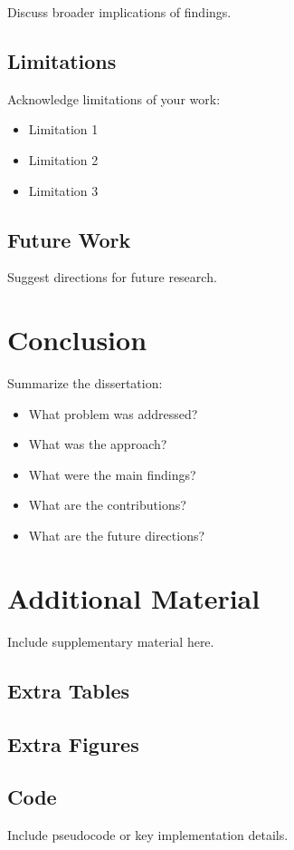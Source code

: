 \documentclass[12pt,oneside]{book}
\theoremstyle{plain}
\theoremstyle{definition}
\begin{document}
Discuss broader implications of findings.

\section{Limitations}

Acknowledge limitations of your work:

\begin{itemize}
  \item Limitation 1
  \item Limitation 2
  \item Limitation 3
\end{itemize}

\section{Future Work}

Suggest directions for future research.

\chapter{Conclusion}
\label{chapter:conclusion}

Summarize the dissertation:

\begin{itemize}
  \item What problem was addressed?
  \item What was the approach?
  \item What were the main findings?
  \item What are the contributions?
  \item What are the future directions?
\end{itemize}




\appendix

\chapter{Additional Material}

Include supplementary material here.

\section{Extra Tables}

\section{Extra Figures}

\section{Code}

Include pseudocode or key implementation details.
\end{document}
